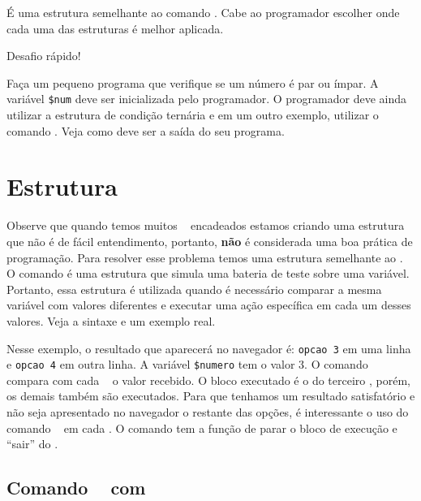 É uma estrutura semelhante ao comando \comandoifelse. Cabe ao programador escolher onde
cada uma das estruturas é melhor aplicada.

{\Large Desafio rápido!}

Faça um pequeno programa que verifique se um número é par ou ímpar. A variável
\texttt{\$num} deve ser inicializada pelo programador. O programador deve ainda
utilizar a estrutura de condição ternária e em um outro exemplo, utilizar o comando
\comandoifelse. Veja como deve ser a saída do seu programa. 


\section{Estrutura \comandoswitch}
\label{estrutura-switch}

Observe que quando temos muitos \comandoifelse~ encadeados estamos criando uma estrutura 
que não é de fácil entendimento, portanto, \textbf{não} é considerada uma boa prática de 
programação. Para resolver esse problema temos uma estrutura semelhante ao \comandoifelse. 
O comando \comandoswitch é uma estrutura que simula uma bateria de teste sobre uma variável. 
Portanto, essa estrutura é utilizada quando é  necessário comparar a mesma variável 
com valores diferentes e executar uma ação específica em cada um desses valores. Veja
a sintaxe e um exemplo real.



Nesse exemplo, o resultado que aparecerá no navegador é: \texttt{opcao 3} em uma linha e \texttt{opcao 4}
em outra linha. A variável \texttt{\$numero} tem o valor 3.  O comando \comandoswitch~ 
compara com cada \comandocase~ o valor recebido. O bloco executado é o do terceiro \comandocase, 
porém, os demais também são executados. Para que tenhamos um resultado satisfatório e não seja
apresentado no navegador o restante das opções, é interessante o uso do comando \comandobreak~ em 
cada \comandocase. O comando \comandobreak tem a função de parar o bloco de execução e ``sair''
do \comandoswitch.

\subsection{Comando \comandoswitch~ com \comandobreak}
\label{comando-switch-com-break}

